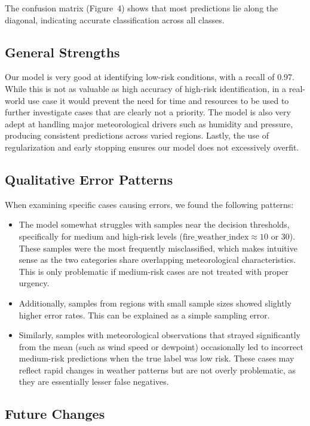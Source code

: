 \documentclass[11pt]{article}
\begin{document}
The confusion matrix (Figure~4) shows that most predictions lie along the diagonal, indicating accurate classification across all classes.

\subsection{General Strengths}

Our model is very good at identifying low-risk conditions, with a recall of 0.97. While this is not as valuable as high accuracy of high-risk identification, in a real-world use case it would prevent the need for time and resources to be used to further investigate cases that are clearly not a priority. The model is also very adept at handling major meteorological drivers such as humidity and pressure, producing consistent predictions across varied regions. Lastly, the use of regularization and early stopping ensures our model does not excessively overfit.

\subsection{Qualitative Error Patterns}

When examining specific cases causing errors, we found the following patterns:

\begin{itemize}
    \item The model somewhat struggles with samples near the decision thresholds, specifically for medium and high-risk levels ($\text{fire\_weather\_index} \approx 10$ or $30$). These samples were the most frequently misclassified, which makes intuitive sense as the two categories share overlapping meteorological characteristics. This is only problematic if medium-risk cases are not treated with proper urgency.
    \item Additionally, samples from regions with small sample sizes showed slightly higher error rates. This can be explained as a simple sampling error.
    \item Similarly, samples with meteorological observations that strayed significantly from the mean (such as wind speed or dewpoint) occasionally led to incorrect medium-risk predictions when the true label was low risk. These cases may reflect rapid changes in weather patterns but are not overly problematic, as they are essentially lesser false negatives.
\end{itemize}

\subsection{Future Changes}
\end{document}
